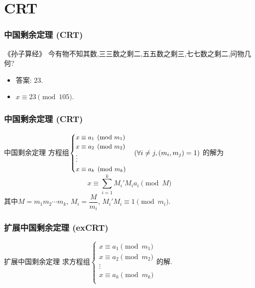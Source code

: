 \documentclass{beamer}
\newcommand{\pau}{}
\begin{document}
\section{CRT}
\begin{frame}[fragile]
    \frametitle{中国剩余定理 (CRT)}
    \begin{exampleblock}{《孙子算经》}
        今有物不知其数,三三数之剩二,五五数之剩三,七七数之剩二,问物几何?
    \end{exampleblock} \pau
    \begin{itemize}
        \item 答案: $23$. \pau
        \item $x\equiv 23\pmod{105}$.
    \end{itemize}
\end{frame}

\begin{frame}[fragile]
    \frametitle{中国剩余定理 (CRT)}
    \begin{block}{中国剩余定理}
        方程组$\small\begin{cases}
		x\equiv a_1\pmod{m_1}\\
		x\equiv a_2\pmod{m_2}\\
		\vdots\\
		x\equiv a_k\pmod{m_k}\\
		\end{cases}\left(\forall i\neq j,(m_i,m_j)=1\right)$
		的解\pau 为$$x\equiv\sum\limits_{i=1}^kM_i'M_ia_i\pmod M$$其中$M=m_1m_2\cdots m_k$, $M_i=\dfrac{M}{m_i}$, $M_i'M_i\equiv1\pmod{m_i}$.
    \end{block}
\end{frame}

\begin{frame}[fragile]
    \frametitle{扩展中国剩余定理 (exCRT)}
    \begin{block}{扩展中国剩余定理}
        求方程组$\begin{cases}
		x\equiv a_1\pmod{m_1}\\
		x\equiv a_2\pmod{m_2}\\
		\vdots\\
		x\equiv a_k\pmod{m_k}\\
		\end{cases}$的解.
    \end{block}
\end{frame}
\end{document}
